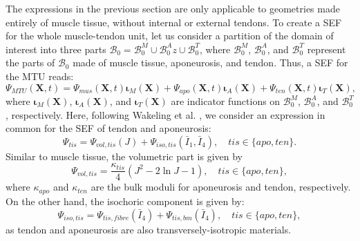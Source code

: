 \documentclass{sfuthesis}
\numberwithin{equation}{section}
\numberwithin{figure}{chapter}
\numberwithin{table}{chapter}
\theoremstyle{definition}
\def\*#1{{\mathbf{#1}}} %
\newcommand{\B}{\mathcal{B}}
\newcommand{\I}{{\bar{I}}}
\begin{document}
The expressions in the previous section are only applicable to geometries made entirely of muscle tissue, without internal or external tendons. To create a SEF for the whole muscle-tendon unit, let us consider a partition of the domain of interest into three parts $\B_0 = \B_0^M \cup \B_0^A z \cup \B_0^T$, where $\B_0^M$, $\B_0^A$, and $\B_0^T$ represent the parts of $\B_0$ made of muscle tissue, aponeurosis, and tendon. Thus, a SEF for the MTU reads:
\begin{equation}
    \Psi_{MTU}(\*X,t) = \Psi_{mus}(\*X,t) \bm{\iota}_M(\*X) + \Psi_{apo}(\*X,t) \bm{\iota}_A(\*X) + \Psi_{ten}(\*X,t) \bm{\iota}_T(\*X),
\end{equation}
where $\bm{\iota}_M(\*X)$, $\bm{\iota}_A(\*X)$, and $\bm{\iota}_T(\*X)$ are indicator functions on $\B_0^M$, $\B_0^A$, and $\B_0^T$, respectively. Here, following Wakeling et al. \cite{Paper1_WakelingEtAl2020}, we consider an expression in common for the SEF of tendon and aponeurosis:
\begin{equation}
    \Psi_{tis} = \Psi_{vol,tis}(J) + \Psi_{iso,tis}(\I_1,\I_4), \quad tis \in \{apo,ten\}.
\end{equation}
Similar to muscle tissue, the volumetric part is given by
\begin{equation}
    \Psi_{vol,tis} = \dfrac{\kappa_{tis}}{4} \left( J^2 - 2\ln J - 1 \right), \quad tis \in \{apo,ten\},
\end{equation}
where $\kappa_{apo}$ and $\kappa_{ten}$ are the bulk moduli for aponeurosis and tendon, respectively. On the other hand, the isochoric component is given by:
\begin{equation}
    \Psi_{iso,tis} = \Psi_{tis,fibre}(\I_4) + \Psi_{tis,bm}(\I_4), \quad tis \in \{apo,ten\},
\end{equation}
as tendon and aponeurosis are also transversely-isotropic materials.
\end{document}
